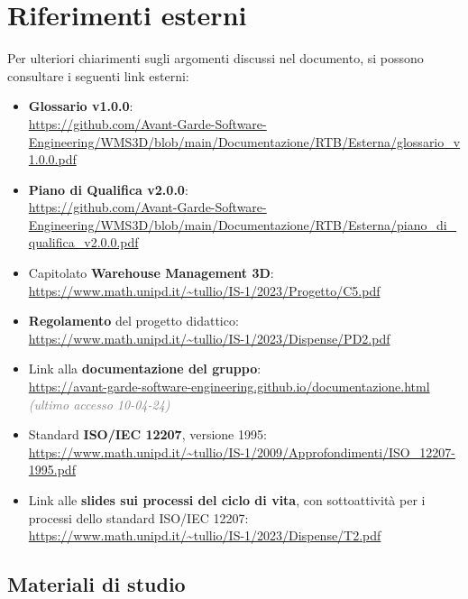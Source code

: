 \section{Riferimenti esterni}\label{sec:riferimenti_esterni}
Per ulteriori chiarimenti sugli argomenti discussi nel documento, si possono consultare i seguenti link esterni:
\begin{itemize}
    \item \textbf{Glossario v1.0.0}:\\
    \url{https://github.com/Avant-Garde-Software-Engineering/WMS3D/blob/main/Documentazione/RTB/Esterna/glossario_v1.0.0.pdf}
    \item \textbf{Piano di Qualifica v2.0.0}:\\
    \url{https://github.com/Avant-Garde-Software-Engineering/WMS3D/blob/main/Documentazione/RTB/Esterna/piano_di_qualifica_v2.0.0.pdf}
    \item Capitolato \textbf{Warehouse Management 3D}:\\
    \url{https://www.math.unipd.it/~tullio/IS-1/2023/Progetto/C5.pdf} 
    \item \textbf{Regolamento} del progetto didattico:\\
    \url{https://www.math.unipd.it/~tullio/IS-1/2023/Dispense/PD2.pdf} 
    \item Link alla \textbf{documentazione del gruppo}:\\
    \url{https://avant-garde-software-engineering.github.io/documentazione.html} \textcolor{gray}{\textit{(ultimo accesso 10-04-24)}}
    \item Standard \textbf{ISO/IEC 12207}, versione 1995:\\
    \url{https://www.math.unipd.it/~tullio/IS-1/2009/Approfondimenti/ISO_12207-1995.pdf} 
    \item Link alle \textbf{slides sui processi del ciclo di vita}, con sottoattività per i processi dello standard ISO/IEC 12207:\\
    \url{https://www.math.unipd.it/~tullio/IS-1/2023/Dispense/T2.pdf} 
\end{itemize}
\subsection{Materiali di studio}\label{sec:riferimenti_esterni:materiali_di_studio}
